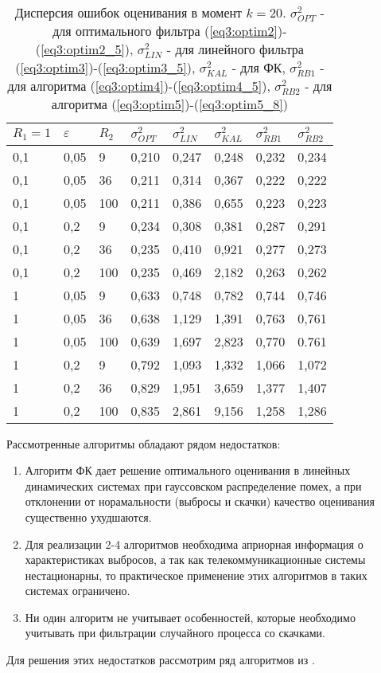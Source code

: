 \begin{table} [h]
  \centering
  \parbox{15cm}{\caption{Дисперсия ошибок оценивания в момент $k=20$. $\sigma_{OPT}^2$ - для оптимального фильтра (\ref{eq3:optim2})-(\ref{eq3:optim2_5}), $\sigma_{LIN}^2$ - для линейного фильтра (\ref{eq3:optim3})-(\ref{eq3:optim3_5}), $\sigma_{KAL}^2$ - для ФК, $\sigma_{RB1}^2$ - для алгоритма (\ref{eq3:optim4})-(\ref{eq3:optim4_5}), $\sigma_{RB2}^2$ - для алгоритма (\ref{eq3:optim5})-(\ref{eq3:optim5_8}) \cite{Klekis}} \label{disp_opt}} 
\begin{center}
\begin{tabular}{|l|l|l|l|l|l|l|l|} \hline \hline
$R_1=1$ & $\varepsilon$ & $R_2$ & $\sigma_{OPT}^2$ & $\sigma_{LIN}^2$ & $\sigma_{KAL}^2$ & $\sigma_{RB1}^2$ & $\sigma_{RB2}^2$\\\hline \hline
0,1 & 0,05 & 9 & 0,210 & 0,247 & 0,248 & 0,232 & 0,234\\\hline \hline
0,1 & 0,05 & 36 & 0,211 & 0,314 & 0,367 & 0,222 & 0,222\\\hline
0,1 & 0,05 & 100 & 0,211 & 0,386 & 0,655 & 0,223 & 0,223\\\hline
0,1 & 0,2 & 9 & 0,234 & 0,308 & 0,381 & 0,287 & 0,291\\\hline
0,1 & 0,2 & 36 & 0,235 & 0,410 & 0,921 & 0,277 & 0,273\\\hline
0,1 & 0,2 & 100 & 0,235 & 0,469 & 2,182 & 0,263 & 0,262\\\hline
1 & 0,05 & 9 & 0,633 & 0,748 & 0,782 & 0,744 & 0,746\\\hline
1 & 0,05 & 36 & 0,638 & 1,129 & 1,391 & 0,763 & 0,761\\\hline
1 & 0,05 & 100 & 0,639 & 1,697 & 2,823 & 0,770 & 0.761\\\hline
1 & 0,2 & 9 & 0,792 & 1,093 & 1,332 & 1,066 & 1,072\\\hline
1 & 0,2 & 36 & 0,829 & 1,951 & 3,659 & 1,377 & 1,407\\\hline
1 & 0,2 & 100 & 0,835 & 2,861 & 9,156 & 1,258 & 1,286\\\hline
\end{tabular}
\end{center}
\end{table}

Рассмотренные алгоритмы обладают рядом недостатков:
\begin{enumerate}
 \item Алгоритм ФК дает решение оптимального оценивания в линейных динамических системах при гауссовском распределение помех, а при отклонении от норамальности (выбросы и скачки) качество оценивания существенно ухудшаются.
 \item Для реализации 2-4 алгоритмов необходима априорная информация о характеристиках выбросов, а так как телекоммуникационные системы нестационарны, то практическое применение этих алгоритмов в таких системах ограничено.
 \item Ни один алгоритм не учитывает особенностей, которые необходимо учитывать при фильтрации случайного процесса со скачками.
\end{enumerate}
Для решения этих недостатков рассмотрим ряд алгоритмов из \cite{RobustFilter}.

